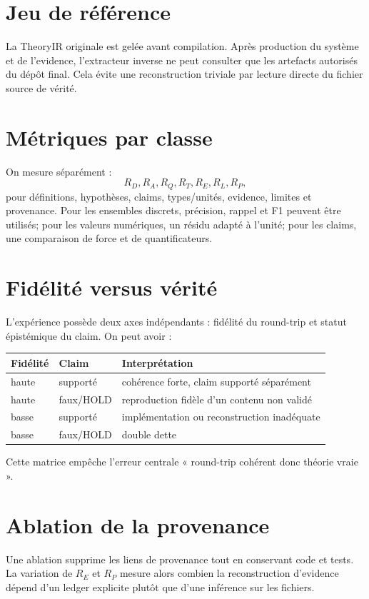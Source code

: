 \section{Jeu de référence}

La TheoryIR originale est gelée avant compilation. Après production du système et de l'evidence, l'extracteur inverse ne peut consulter que les artefacts autorisés du dépôt final. Cela évite une reconstruction triviale par lecture directe du fichier source de vérité.

\section{Métriques par classe}

On mesure séparément :
\[
R_D,R_A,R_Q,R_T,R_E,R_L,R_P,
\]
pour définitions, hypothèses, claims, types/unités, evidence, limites et provenance. Pour les ensembles discrets, précision, rappel et F1 peuvent être utilisés; pour les valeurs numériques, un résidu adapté à l'unité; pour les claims, une comparaison de force et de quantificateurs.

\section{Fidélité versus vérité}

L'expérience possède deux axes indépendants : fidélité du round-trip et statut épistémique du claim. On peut avoir :
\begin{center}
\begin{tabular}{lll}
\toprule
Fidélité & Claim & Interprétation \\
\midrule
haute & supporté & cohérence forte, claim supporté séparément \\
haute & faux/HOLD & reproduction fidèle d'un contenu non validé \\
basse & supporté & implémentation ou reconstruction inadéquate \\
basse & faux/HOLD & double dette \\
\bottomrule
\end{tabular}
\end{center}
Cette matrice empêche l'erreur centrale « round-trip cohérent donc théorie vraie ».

\section{Ablation de la provenance}

Une ablation supprime les liens de provenance tout en conservant code et tests. La variation de $R_E$ et $R_P$ mesure alors combien la reconstruction d'evidence dépend d'un ledger explicite plutôt que d'une inférence sur les fichiers.

